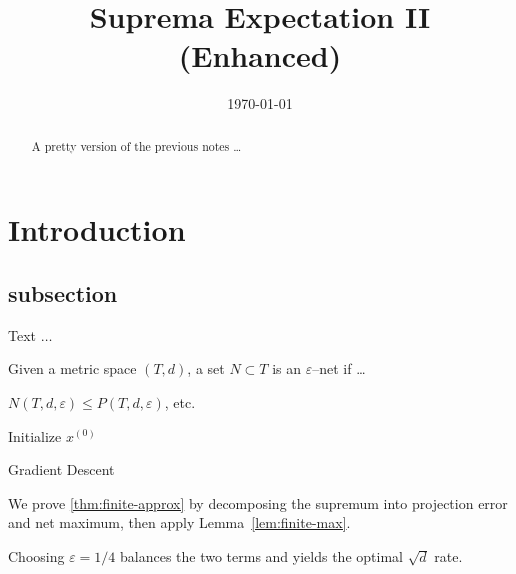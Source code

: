 \documentclass{article}
\title{Suprema Expectation II (Enhanced)}
\author{}
\date{\today}
\begin{document}
\maketitle

\begin{abstract}
A pretty version of the previous notes …
\end{abstract}

\section{Introduction}
\subsection{subsection}
Text $\ldots$

\begin{definition}[ε–net]
Given a metric space $(T,d)$, a set $N\subset T$ is an $\varepsilon$–net if …
\end{definition}

\begin{lemma}
$N(T,d,\varepsilon)\le P(T,d,\varepsilon)$, etc.
\end{lemma}
\begin{algorithm}[H]
Initialize $x^{(0)}$\;
\caption{Gradient Descent}\label{alg:gd}
\end{algorithm}

\begin{analysisBox}
We prove \cref{thm:finite-approx} by decomposing the supremum into
projection error and net maximum, then apply Lemma~\ref{lem:finite-max}.
\end{analysisBox}

\begin{remarkBox}
Choosing $\varepsilon = 1/4$ balances the two terms and yields the
optimal $\sqrt{d}$ rate.
\end{remarkBox}

\printbibliography       %
\end{document}
